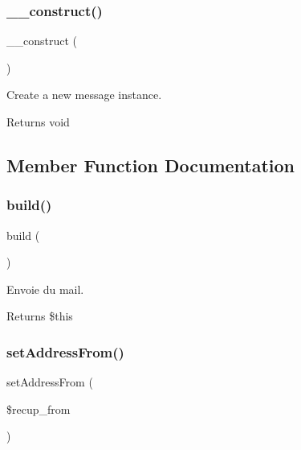 \subsubsection{\texorpdfstring{\+\_\+\+\_\+construct()}{\_\_construct()}}
{\footnotesize\ttfamily \+\_\+\+\_\+construct (\begin{DoxyParamCaption}{ }\end{DoxyParamCaption})}

Create a new message instance.

\begin{DoxyReturn}{Returns}
void 
\end{DoxyReturn}


\subsection{Member Function Documentation}
\mbox{\label{class_app_1_1_mail_1_1_password_reset_a3928875ef0ceb18a51c1061be3eb3a00}} 
\subsubsection{\texorpdfstring{build()}{build()}}
{\footnotesize\ttfamily build (\begin{DoxyParamCaption}{ }\end{DoxyParamCaption})}

Envoie du mail. \begin{DoxyReturn}{Returns}
\$this 
\end{DoxyReturn}
\mbox{\label{class_app_1_1_mail_1_1_password_reset_a60efa98b5e5a3831663d17bd97457842}} 
\subsubsection{\texorpdfstring{set\+Address\+From()}{setAddressFrom()}}
{\footnotesize\ttfamily set\+Address\+From (\begin{DoxyParamCaption}\item[{}]{\$recup\+\_\+from }\end{DoxyParamCaption})}

